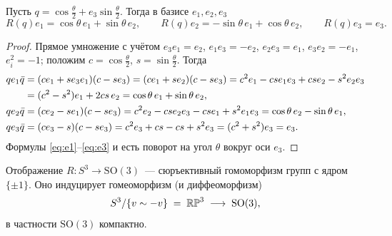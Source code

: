 \begin{lemma}\label{lem:axisangle}
Пусть $q = \cos\tfrac\theta2 + e_3\sin\tfrac\theta2$. Тогда в базисе
$e_1, e_2, e_3$
\begin{equation}\label{eq:rodrigues}
  R(q)e_1 = \cos\theta\, e_1 + \sin\theta\, e_2,\qquad
  R(q)e_2 = -\sin\theta\, e_1 + \cos\theta\, e_2,\qquad
  R(q)e_3 = e_3 .
\end{equation}
\end{lemma}

\begin{proof}
Прямое умножение с учётом $e_3e_1 = e_2$, $e_1e_3 = -e_2$,
$e_2e_3 = e_1$, $e_3e_2 = -e_1$, $e_i^2 = -1$; положим
$c = \cos\tfrac\theta2$, $s = \sin\tfrac\theta2$. Тогда
\begin{align}
  q e_1 \bar q &= (ce_1 + se_3e_1)(c - se_3)
   = (ce_1 + se_2)(c - se_3)
   = c^2e_1 - cse_1e_3 + cse_2 - s^2 e_2e_3 \notag\\
   &= (c^2 - s^2)e_1 + 2cs\,e_2 = \cos\theta\,e_1 + \sin\theta\,e_2,
   \label{eq:e1}\\
  q e_2 \bar q &= (ce_2 - se_1)(c - se_3)
   = c^2e_2 - cse_2e_3 - cse_1 + s^2e_1e_3
   = \cos\theta\,e_2 - \sin\theta\,e_1, \label{eq:e2}\\
  q e_3 \bar q &= (ce_3 - s)(c - se_3)
   = c^2e_3 + cs - cs + s^2e_3 = (c^2+s^2)e_3 = e_3. \label{eq:e3}
\end{align}
Формулы \eqref{eq:e1}--\eqref{eq:e3} и есть поворот на угол $\theta$
вокруг оси $e_3$.
\end{proof}

\begin{theorem}\label{th:rp3so3}
Отображение $R\colon S^3 \to \mathrm{SO}(3)$~--- сюръективный гомоморфизм
групп с ядром $\{\pm 1\}$. Оно индуцирует гомеоморфизм (и диффеоморфизм)
\[
  S^3/\{v \sim -v\} \;=\; \mathbb{RP}^3 \;\longrightarrow\; \mathrm{SO}(3),
\]
в частности $\mathrm{SO}(3)$ компактно.
\end{theorem}


